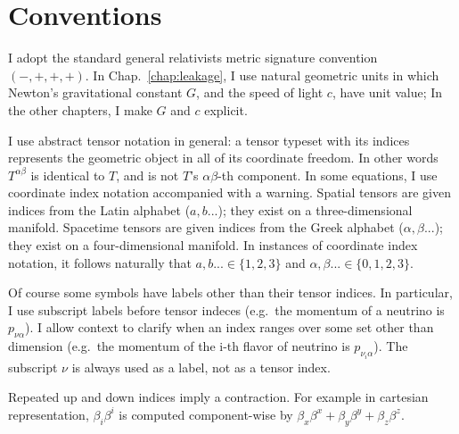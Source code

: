 
\section{Conventions}
\label{sec:conventions}

I adopt the standard general relativists metric signature convention
$(-,+,+,+)$.
In Chap.~\ref{chap:leakage}, I use natural geometric units
in which Newton's gravitational constant $G$, and the speed of light $c$, have unit
value; In the other chapters, I make $G$ and $c$ explicit.

I use abstract tensor notation in general: a tensor typeset with its indices
represents the geometric object in all of its coordinate freedom. In other words
$T^{\alpha \beta}$ is identical to $T$, and is not $T$'s $\alpha\beta$-th
component.
In some equations, I use coordinate index notation accompanied with a warning.
Spatial tensors are given indices from the Latin alphabet ($a,b...$);
they exist on a three-dimensional manifold. Spacetime tensors are given indices from
the Greek alphabet ($\alpha,\beta...$); they exist on a four-dimensional manifold.
In instances of coordinate index notation, it follows naturally that
$a,b...\in\{1,2,3\}$ and $\alpha,\beta...\in\{0,1,2,3\}$.

Of course some symbols have labels other than their tensor indices.
In particular, I use subscript labels before tensor indeces (e.g.\ the
momentum of a neutrino is $p_{\nu \alpha}$). I allow context to clarify when
an index ranges over some set other than dimension (e.g.\ the momentum of the
i-th flavor of neutrino is $p_{\nu_i \alpha}$). The subscript $\nu$ is always
used as a label, not as a tensor index.

Repeated up and down indices imply a contraction. For example
in cartesian representation, $\beta_i\beta^i$ is computed component-wise by
$\beta_x\beta^x+\beta_y\beta^y+\beta_z\beta^z$.

